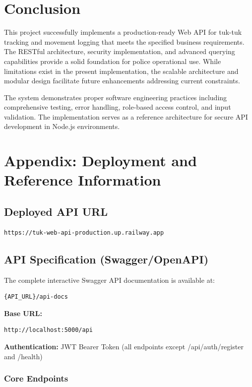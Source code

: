 \documentclass[12pt,a4paper]{article}
\begin{document}
\section{Conclusion}

This project successfully implements a production-ready Web API for tuk-tuk tracking and movement logging that meets the specified business requirements. The RESTful architecture, security implementation, and advanced querying capabilities provide a solid foundation for police operational use. While limitations exist in the present implementation, the scalable architecture and modular design facilitate future enhancements addressing current constraints.

The system demonstrates proper software engineering practices including comprehensive testing, error handling, role-based access control, and input validation. The implementation serves as a reference architecture for secure API development in Node.js environments.

\newpage
\section*{Appendix: Deployment and Reference Information}

\subsection*{Deployed API URL}
\begin{verbatim}
https://tuk-web-api-production.up.railway.app
\end{verbatim}

\subsection*{API Specification (Swagger/OpenAPI)}

The complete interactive Swagger API documentation is available at:
\begin{verbatim}
{API_URL}/api-docs
\end{verbatim}

\textbf{Base URL:}
\begin{verbatim}
http://localhost:5000/api
\end{verbatim}

\textbf{Authentication:} JWT Bearer Token (all endpoints except /api/auth/register and /health)

\subsubsection*{Core Endpoints}
\end{document}
